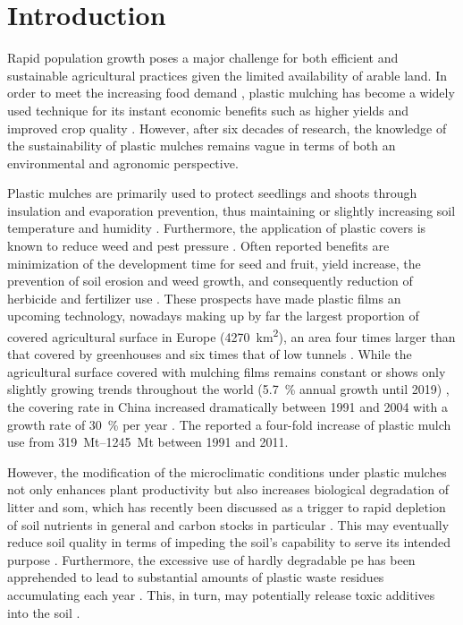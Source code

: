 \section{Introduction}
\label{sec:plastic-mulching:intro}

Rapid population growth poses a major challenge for both efficient and sustainable agricultural practices given the limited availability of arable land. In order to meet the increasing food demand \citep{GodfrayFood2010}, plastic mulching has become a widely used technique for its instant economic benefits such as higher yields and improved crop quality \citep{LamontPlastic1993}. However, after six decades of research, the knowledge of the sustainability of plastic mulches remains vague in terms of both an environmental and agronomic perspective.

Plastic mulches are primarily used to protect seedlings and shoots through insulation and evaporation prevention, thus maintaining or slightly increasing soil temperature and humidity \citep{TararaMicroclimate2000}. Furthermore, the application of plastic covers is known to reduce weed and pest pressure \citep{McKenzieLandscape2001}. Often reported benefits are minimization of the development time for seed and fruit, yield increase, the prevention of soil erosion and weed growth, and consequently reduction of herbicide and fertilizer use \citep{Chalker-ScottImpact2007,EspiPlastic2006,LamontPlastic1993, Scarascia-MugnozzaPlastic2011}. These prospects have made plastic films an upcoming technology, nowadays making up by far the largest proportion of covered agricultural surface
in Europe (\SI{4270}{\square\kilo\meter}), an area four times larger than that covered by greenhouses and six times that of low tunnels \citep{Scarascia-MugnozzaPlastic2011}. While the agricultural surface covered with mulching films remains constant or shows only slightly growing trends throughout the world (\SI{5.7}{\percent} annual growth until 2019) \citep{TransparencyMarketResearchAgricultural2013}, the covering rate in China increased dramatically between 1991 and 2004 with a growth rate of \SI{30}{\percent} per year \citep{EspiPlastic2006}. The \citet{NationalBureauofStatisticsofChinaChina2012} reported a four-fold increase of plastic mulch use from \SIrange[range-phrase = { to }]{319}{1245}{\mega\tonne} between 1991 and 2011.

However, the modification of the microclimatic conditions under plastic mulches not only enhances plant productivity but also increases biological degradation of litter and \ac{som}, which has recently been discussed as a trigger to rapid depletion of soil nutrients in general and carbon stocks in particular \citep{Domagala-SwiatkiewiczEffect2013,ZhangEffects2015}. This may eventually reduce soil quality in terms of impeding the soil's capability to serve its intended purpose \citep{DoranDefining1994}.
Furthermore, the excessive use of hardly degradable \ac{pe} has been apprehended to lead to substantial amounts of plastic waste residues accumulating each year \citep{AlbertssonMechanism1987}. This, in turn, may potentially release toxic additives into the soil \citep{RamosPolyethylene2015}.

